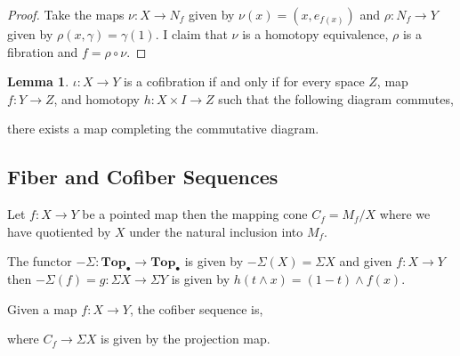 \documentclass[12pt]{extarticle}
\newcommand{\pTop}{\mathbf{Top}_{\bullet}}
\theoremstyle{definition}
\newtheorem{lemma}[theorem]{Lemma}
\newenvironment{definition}[1][Definition:]{\begin{trivlist}
\item[\hskip \labelsep {\bfseries #1}]}{\end{trivlist}}
\begin{document}
\begin{proof}
Take the maps $\nu : X \to N_f$ given by $\nu(x) = (x, e_{f(x)})$ and $\rho : N_f \to Y$ given by $\rho(x, \gamma) = \gamma(1)$. I claim that $\nu$ is a homotopy equivalence, $\rho$ is a fibration and $f = \rho \circ \nu$. 
\end{proof}

\begin{lemma}
$\iota : X \to Y$ is a cofibration if and only if for every space $Z$, map $f : Y \to Z$, and homotopy $h : X \times I \to Z$ such that the following diagram commutes,
\begin{center}
\end{center}  
there exists a map completing the commutative diagram.
\end{lemma}


\subsection{Fiber and Cofiber Sequences}

\begin{definition}
Let $f : X \to Y$ be a pointed map then the mapping cone $C_f = M_f / X$ where we have quotiented by $X$ under the natural inclusion into $M_f$.
\end{definition}

\begin{definition}
The functor $-\Sigma : \pTop \to \pTop$ is given by $-\Sigma (X) = \Sigma X$ and given $f : X \to Y$ then $- \Sigma (f) = g : \Sigma X \to \Sigma Y$ is given by $h(t \wedge x) = (1 - t) \wedge f(x)$. 
\end{definition}

\begin{definition}
Given a map $f : X \to Y$, the cofiber sequence is,
\begin{center}
\end{center}  
where $C_f \to \Sigma X$ is given by the projection map.
\end{definition}
\end{document}
